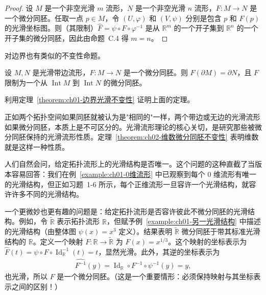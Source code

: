 \documentclass[../../main.tex]{subfiles}
\begin{document}
\begin{proof}
设 $M$ 是一个非空光滑 $m$ 流形，$N$ 是一个非空光滑 $n$ 流形，$F:M\to N$ 是一个微分同胚。任取一点 $p\in M$，令 $(U,\varphi)$ 和 $(V,\psi)$ 分别是包含 $p$ 和 $F(p)$ 的光滑坐标图。则（其限制）$\widehat{F}=\psi\circ F\circ\varphi^{-1}$ 是从 $\mathbb{R}^{m}$ 的一个开子集到 $\mathbb{R}^{n}$ 的一个开子集的微分同胚，因此由命题~C.4 得 $m=n$。
\end{proof}

对边界也有类似的不变性命题。

\begin{theorem}[边界的微分同胚不变性]\label{theorem:ch02-边界微分同胚不变性}
设 $M,N$ 是光滑带边流形，$F:M\to N$ 是一个微分同胚。则 $F(\partial M)=\partial N$，且 $F$ 限制为一个从 $\operatorname{Int}M$ 到 $\operatorname{Int}N$ 的微分同胚。
\end{theorem}

\begin{exercise}\label{exercise:ch02-2.19}
利用定理~\cref{theorem:ch01-边界光滑不变性} 证明上面的定理。
\end{exercise}

正如两个拓扑空间如果同胚就被认为是"相同的"一样，两个带边或无边的光滑流形如果微分同胚，本质上是不可区分的。光滑流形理论的核心关切，是研究那些被微分同胚保持的光滑流形性质。定理~\cref{theorem:ch02-维数微分同胚不变性} 表明维数就是这样一种性质。

人们自然会问，给定拓扑流形上的光滑结构是否唯一。这个问题的这种直截了当版本容易回答：我们在例~\cref{example:ch01-0维流形} 中已观察到每个 $0$ 维流形有唯一的光滑结构，但正如习题~1-6 所示，每个正维流形一旦容许一个光滑结构，就容许许多不同的光滑结构。

一个更微妙也更有趣的问题是：给定拓扑流形是否容许彼此不微分同胚的光滑结构。例如，令 $\widetilde{\mathbb{R}}$ 表示拓扑流形 $\mathbb{R}$，但赋予例~\cref{example:ch01-另一光滑结构} 中描述的光滑结构（由整体图 $\psi(x)=x^{3}$ 定义）。结果表明 $\widetilde{\mathbb{R}}$ 微分同胚于带其标准光滑结构的 $\mathbb{R}$。定义一个映射 $F:\mathbb{R}\to\widetilde{\mathbb{R}}$ 为 $F(x)=x^{1/3}$。这个映射的坐标表示为 $\widehat{F}(t)=\psi\circ F\circ\operatorname{Id}_{\mathbb{R}}^{-1}(t)=t$，显然光滑。此外，其逆的坐标表示为
\begin{align*}
\widehat{F^{-1}}(y)=\operatorname{Id}_{\mathbb{R}}\circ F^{-1}\circ\psi^{-1}(y)=y,
\end{align*}
也光滑，所以 $F$ 是一个微分同胚。（这是一个重要情形：必须保持映射与其坐标表示之间的区别！）
\end{document}
